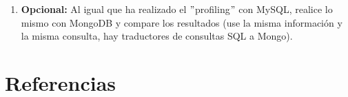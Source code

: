 \documentclass[paper=a4, fontsize=11pt]{scrartcl} %
\numberwithin{equation}{section} %
\numberwithin{figure}{section} %
\numberwithin{table}{section} %
\begin{document}
\begin{enumerate}
		Después, he creado un índice sobre la tabla \textit{proxies\_priv} para agilizar la consulta.
		
		Y podemos ver el resultado en la siguiente captura del proceso\footnote{He emborronado la salida
		de la consulta porque no es de interés para la práctica y son contraseñas, aunque cifradas.}:
		
		\begin{figure}[H]
			\centering
			\texttt{[image: Ejercicio\_19.jpg]}
			\caption{Experimento con el \textit{profile} de \textit{mysql}.}
			\label{fig:profile}	
		\end{figure}
		
	\subsubsection{MongoDB}
		\item \textbf{Opcional:} Al igual que ha realizado el $"$profiling$"$ con MySQL, realice lo
		mismo con MongoDB y compare los resultados (use la misma información y la misma consulta, hay
		traductores de consultas SQL a Mongo).
		
\end{enumerate}

\newpage
\section{Referencias}

\end{document}
